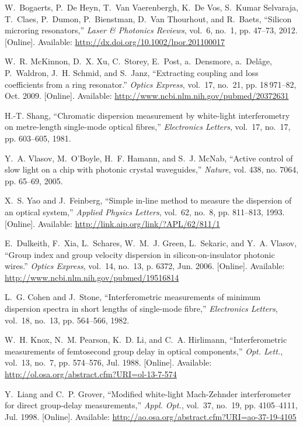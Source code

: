 \begin{thebibliography}{10}
\BIBentryALTinterwordspacing
W.~Bogaerts, P.~{De Heyn}, T.~{Van Vaerenbergh}, K.~{De Vos}, S.~{Kumar
  Selvaraja}, T.~Claes, P.~Dumon, P.~Bienstman, D.~{Van Thourhout}, and
  R.~Baets, ``{Silicon microring resonators},'' \emph{Laser \& Photonics
  Reviews}, vol.~6, no.~1, pp. 47--73, 2012. [Online]. Available:
  \url{http://dx.doi.org/10.1002/lpor.201100017}
\BIBentrySTDinterwordspacing

\BIBentryALTinterwordspacing
W.~R. McKinnon, D.~X. Xu, C.~Storey, E.~Post, a.~Densmore, a.~Del\^{a}ge,
  P.~Waldron, J.~H. Schmid, and S.~Janz, ``{Extracting coupling and loss
  coefficients from a ring resonator.}'' \emph{Optics Express}, vol.~17,
  no.~21, pp. 18\,971--82, Oct. 2009. [Online]. Available:
  \url{http://www.ncbi.nlm.nih.gov/pubmed/20372631}
\BIBentrySTDinterwordspacing

H.-T. Shang, ``{Chromatic dispersion measurement by white-light interferometry
  on metre-length single-mode optical fibres},'' \emph{Electronics Letters},
  vol.~17, no.~17, pp. 603--605, 1981.

Y.~A. Vlasov, M.~O'Boyle, H.~F. Hamann, and S.~J. McNab, ``{Active control of
  slow light on a chip with photonic crystal waveguides},'' \emph{Nature}, vol.
  438, no. 7064, pp. 65--69, 2005.

\BIBentryALTinterwordspacing
X.~S. Yao and J.~Feinberg, ``{Simple in-line method to measure the dispersion
  of an optical system},'' \emph{Applied Physics Letters}, vol.~62, no.~8, pp.
  811--813, 1993. [Online]. Available:
  \url{http://link.aip.org/link/?APL/62/811/1}
\BIBentrySTDinterwordspacing

\BIBentryALTinterwordspacing
E.~Dulkeith, F.~Xia, L.~Schares, W.~M.~J. Green, L.~Sekaric, and Y.~A. Vlasov,
  ``{Group index and group velocity dispersion in silicon-on-insulator photonic
  wires.}'' \emph{Optics Express}, vol.~14, no.~13, p. 6372, Jun. 2006.
  [Online]. Available:
  \url{http://www.ncbi.nlm.nih.gov/pubmed/19516814}
\BIBentrySTDinterwordspacing

L.~G. Cohen and J.~Stone, ``{Interferometric measurements of minimum dispersion
  spectra in short lengths of single-mode fibre},'' \emph{Electronics Letters},
  vol.~18, no.~13, pp. 564--566, 1982.

\BIBentryALTinterwordspacing
W.~H. Knox, N.~M. Pearson, K.~D. Li, and C.~A. Hirlimann, ``{Interferometric
  measurements of femtosecond group delay in optical components},'' \emph{Opt.
  Lett.}, vol.~13, no.~7, pp. 574--576, Jul. 1988. [Online]. Available:
  \url{http://ol.osa.org/abstract.cfm?URI=ol-13-7-574}
\BIBentrySTDinterwordspacing

\BIBentryALTinterwordspacing
Y.~Liang and C.~P. Grover, ``{Modified white-light Mach-Zehnder interferometer
  for direct group-delay measurements},'' \emph{Appl. Opt.}, vol.~37, no.~19,
  pp. 4105--4111, Jul. 1998. [Online]. Available:
  \url{http://ao.osa.org/abstract.cfm?URI=ao-37-19-4105}
\BIBentrySTDinterwordspacing

\end{thebibliography}
